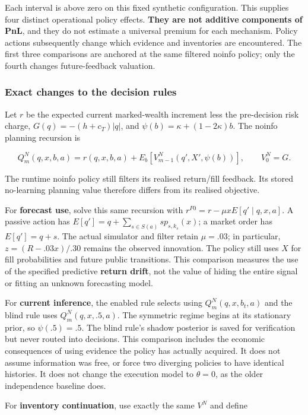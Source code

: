 \documentclass[
  10pt,
  a4paper,
]{article}
\begin{document}
Each interval is above zero on this fixed synthetic configuration. This
supplies four distinct operational policy effects. \textbf{They are not
additive components of PnL}, and they do not estimate a universal
premium for each mechanism. Policy actions subsequently change which
evidence and inventories are encountered. The first three comparisons
are anchored at the same filtered noinfo policy; only the fourth changes
future-feedback valuation.

\subsubsection{Exact changes to the decision
rules}\label{exact-changes-to-the-decision-rules}

Let \(r\) be the expected current marked-wealth increment less the
pre-decision risk charge, \(G(q)=-(h+c_T)|q|\), and
\(\psi(b)=\kappa+(1-2\kappa)b\). The noinfo planning recursion is

\[
Q_m^N(q,x,b,a)=r(q,x,b,a)+
E_b[V_{m-1}^N(q',X',\psi(b))],\qquad V_0^N=G.
\]

The runtime noinfo policy still filters its realised return/fill
feedback. Its stored no-learning planning value therefore differs from
its realised objective.

For \textbf{forecast use}, solve this same recursion with
\(r^{F0}=r-\mu xE[q'\mid q,x,a]\). A passive action has
\(E[q']=q+\sum_{s\in S(a)}s p_{s,k_s}(x)\); a market order has
\(E[q']=q+s\). The actual simulator and filter retain \(\mu=.03\); in
particular, \(z=(R-.03x)/.30\) remains the observed innovation. The
policy still uses \(X\) for fill probabilities and future public
transitions. This comparison measures the use of the specified
predictive \textbf{return drift}, not the value of hiding the entire
signal or fitting an unknown forecasting model.

For \textbf{current inference}, the enabled rule selects using
\(Q_m^N(q,x,b_t,a)\) and the blind rule uses \(Q_m^N(q,x,.5,a)\). The
symmetric regime begins at its stationary prior, so \(\psi(.5)=.5\). The
blind rule's shadow posterior is saved for verification but never routed
into decisions. This comparison includes the economic consequences of
using evidence the policy has actually acquired. It does not assume
information was free, or force two diverging policies to have identical
histories. It does not change the execution model to \(\theta=0\), as
the older independence baseline does.

For \textbf{inventory continuation}, use exactly the same \(V^N\) and
define
\end{document}
